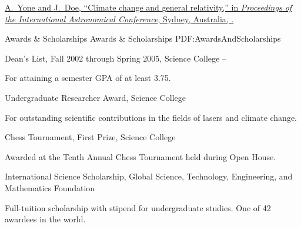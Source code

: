 \documentclass[letterpaper,MMMyyyy,nonstopmode]{simpleresumecv}
\begin{document}
\begin{Body}
  \Gap
    \NumberedItem{[100]}
    \href{http://www.example.com/my-paper-doi-2}
    {A.~Yone and \underline{J.~Doe},
    ``Climate change and general relativity,''
    in \textit{Proceedings of the International Astronomical Conference},
    Sydney, Australia,
    .}


  \endgroup


  \Section
  {Awards \&\newline
  Scholarships}
  {Awards \& Scholarships}
  {PDF:AwardsAndScholarships}

  \BulletItem
    Dean's List,
    Fall 2002 through Spring 2005,
    Science College
    \hfill
     --
    \begin{Detail}
    \Item
    For attaining a semester GPA of at least 3.75.
    \end{Detail}

  \Gap
    \BulletItem
      Undergraduate Researcher Award,
      Science College
      \hfill
      \begin{Detail}
      \Item
      For outstanding scientific contributions in the fields of lasers and climate change.
      \end{Detail}

  \Gap
    \BulletItem
      Chess Tournament,
      First Prize,
      Science College
      \hfill
      \begin{Detail}
      \Item
      Awarded at the Tenth Annual Chess Tournament held during Open House.
      \end{Detail}

  \Gap
    \BulletItem
      International Science Scholarship,
      \hfill
      \newline
      Global Science, Technology, Engineering, and Mathematics Foundation
      \begin{Detail}
      \Item
      Full-tuition scholarship with stipend for undergraduate studies.
      One of 42 awardees in the world.
      \end{Detail}


\end{Body}
\end{document}
